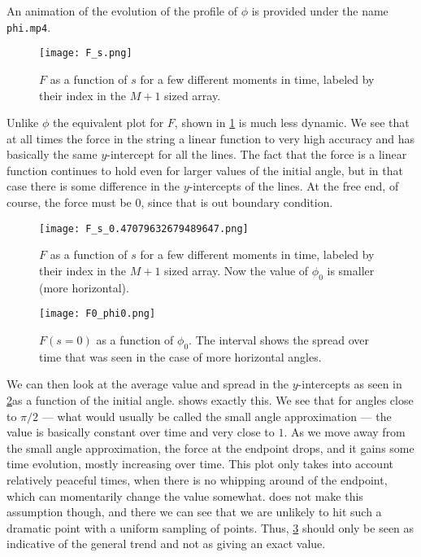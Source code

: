 \documentclass[10pt,a4paper,twocolumn]{article}
\begin{document}
An animation of the evolution of the profile of $\phi$ is provided under the name \texttt{phi.mp4}.

\begin{figure}[!h]
    \centering
    \texttt{[image: F\_s.png]}
    \caption{$F$ as a function of $s$ for a few different moments in time, labeled by their index in the $M+1$ sized array.}
    \label{fig:F_s}
\end{figure}

Unlike $\phi$ the equivalent plot for $F$, shown in \cref{fig:F_s} is much less dynamic. We see that at all times the force in the string a linear function to very high accuracy and has basically the same $y$-intercept for all the lines. The fact that the force is a linear function continues to hold even for larger values of the initial angle, but in that case there is some difference in the $y$-intercepts of the lines. At the free end, of course, the force must be $0$, since that is out boundary condition.

\begin{figure}[!t]
    \centering
    \texttt{[image: F\_s\_0.47079632679489647.png]}
    \caption{$F$ as a function of $s$ for a few different moments in time, labeled by their index in the $M+1$ sized array. Now the value of $\phi_0$ is smaller (more horizontal).}
    \label{fig:F_s_alt}
\end{figure}

\begin{figure}[!b]
    \centering
    \texttt{[image: F0\_phi0.png]}
    \caption{$F(s=0)$ as a function of $\phi_0$. The interval shows the spread over time that was seen in the case of more horizontal angles.}
    \label{fig:F0_phi0}
\end{figure}

We can then look at the average value and spread in the $y$-intercepts as seen in \cref{fig:F_s_alt}as a function of the initial angle.  shows exactly this. We see that for angles close to $\pi/2$ --- what would usually be called the small angle approximation --- the value is basically constant over time and very close to $1$. As we move away from the small angle approximation, the force at the endpoint drops, and it gains some time evolution, mostly increasing over time. This plot only takes into account relatively peaceful times, when there is no whipping around of the endpoint, which can momentarily change the value somewhat.  does not make this assumption though, and there we can see that we are unlikely to hit such a dramatic point with a uniform sampling of points. Thus, \cref{fig:F0_phi0} should only be seen as indicative of the general trend and not as giving an exact value.
\end{document}
